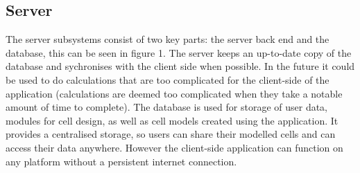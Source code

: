\documentclass{report}
\begin{document}
			\subsection{Server}
				The server subsystems consist of two key parts: the server back end and the database, this can be seen in figure 1. The server keeps an up-to-date copy of the database and sychronises with the client side when possible. In the future it could be used to do calculations that are too complicated for the client-side of the application (calculations are deemed too complicated when they take a notable amount of time to complete).
				The database is used for storage of user data, modules for cell design, as well as cell models created using the application. It provides a centralised storage, so users can share their modelled cells and can access their data anywhere. However the client-side application can function on any platform without a persistent internet connection.	\\
\end{document}
